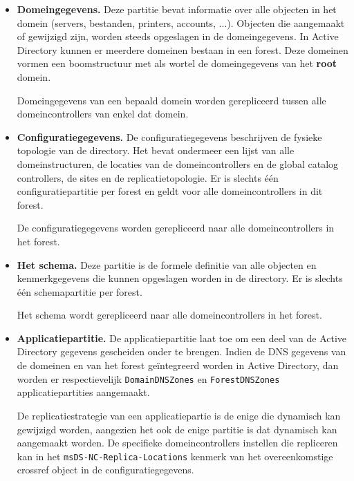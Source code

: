 \documentclass{report}
\begin{document}
\begin{enumerate}
{		}
		
		 {
			\begin{itemize}
				\item \textbf{Domeingegevens.} Deze partitie bevat informatie over alle objecten in het domein (servers, bestanden, printers, accounts, ...). Objecten die aangemaakt of gewijzigd zijn, worden steeds opgeslagen in de domeingegevens. In Active Directory kunnen er meerdere domeinen bestaan in een forest. Deze domeinen vormen een boomstructuur met als wortel de domeingegevens van het \textbf{root} domein. 
				
				Domeingegevens van een bepaald domein worden gerepliceerd tussen alle domeincontrollers van enkel dat domein.

				\item \textbf{Configuratiegegevens.} De configuratiegegevens beschrijven de fysieke topologie van de directory. Het bevat ondermeer een lijst van alle domeinstructuren, de locaties van de domeincontrollers en de global catalog controllers, de sites en de replicatietopologie. Er is slechts één configuratiepartitie per forest en geldt voor alle domeincontrollers in dit forest.

				De configuratiegegevens worden gerepliceerd naar alle domeincontrollers in het forest.
				\item \textbf{Het schema.} Deze partitie is de formele definitie van alle objecten en kenmerkgegevens die kunnen opgeslagen worden in de directory. Er is slechts één schemapartitie per forest.

				Het schema wordt gerepliceerd naar alle domeincontrollers in het forest.
				\item \textbf{Applicatiepartitie.} De applicatiepartitie laat toe om een deel van de Active Directory gegevens gescheiden onder te brengen. Indien de DNS gegevens van de domeinen en van het forest geïntegreerd worden in Active Directory, dan worden er respectievelijk \texttt{DomainDNSZones} en \texttt{ForestDNSZones} applicatiepartities aangemaakt.
				
				De replicatiestrategie van een applicatiepartie is de enige die dynamisch kan gewijzigd worden, aangezien het ook de enige partitie is dat dynamisch kan aangemaakt worden. De specifieke domeincontrollers instellen die repliceren kan in het \texttt{msDS-NC-Replica-Locations} kenmerk van het overeenkomstige crossref object in de configuratiegegevens. 
			\end{itemize}
			
		}
	\end{enumerate}
	
\end{document}
